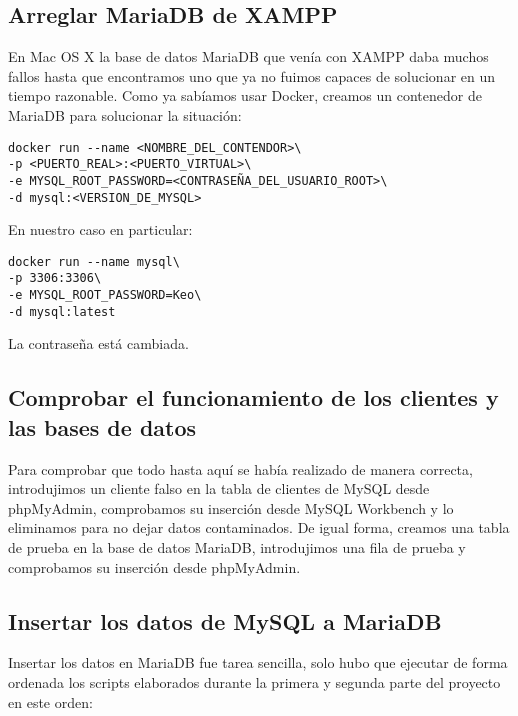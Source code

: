 \documentclass[a4paper, 11pt, oneside]{article} %
\begin{document}
\subsection{Arreglar MariaDB de XAMPP}

En Mac OS X la base de datos MariaDB que venía con XAMPP daba muchos fallos hasta que encontramos uno que ya no fuimos capaces de solucionar en un tiempo razonable. Como ya sabíamos usar Docker, creamos un contenedor de MariaDB para solucionar la situación:

\begin{verbatim}
docker run --name <NOMBRE_DEL_CONTENDOR>\
-p <PUERTO_REAL>:<PUERTO_VIRTUAL>\
-e MYSQL_ROOT_PASSWORD=<CONTRASEÑA_DEL_USUARIO_ROOT>\
-d mysql:<VERSION_DE_MYSQL>
\end{verbatim}

En nuestro caso en particular:

\begin{verbatim}
docker run --name mysql\
-p 3306:3306\
-e MYSQL_ROOT_PASSWORD=Keo\
-d mysql:latest
\end{verbatim}

La contraseña está cambiada.




\subsection{Comprobar el funcionamiento de los clientes y las bases de datos}

Para comprobar que todo hasta aquí se había realizado de manera correcta, introdujimos un cliente falso en la tabla de clientes de MySQL desde phpMyAdmin, comprobamos su inserción desde MySQL Workbench y lo eliminamos para no dejar datos contaminados. De igual forma, creamos una tabla de prueba en la base de datos MariaDB, introdujimos una fila de prueba y comprobamos su inserción desde phpMyAdmin.




\subsection{Insertar los datos de MySQL a MariaDB}

Insertar los datos en MariaDB fue tarea sencilla, solo hubo que ejecutar de forma ordenada los scripts elaborados durante la primera y segunda parte del proyecto en este orden:
\end{document}
